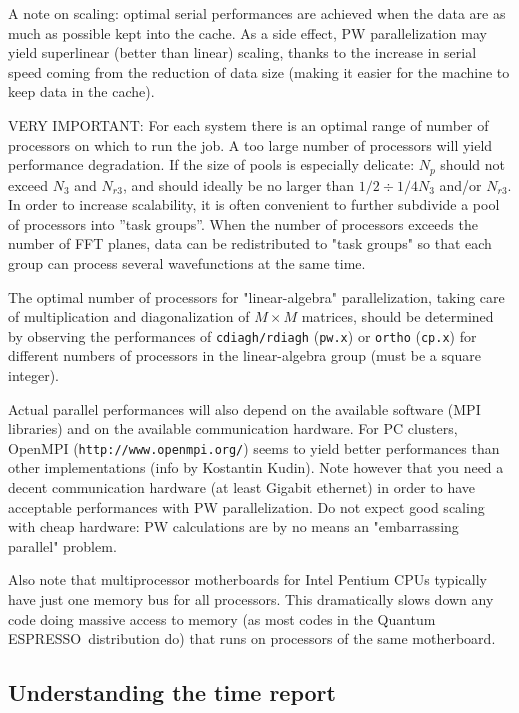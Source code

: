 \documentclass[12pt,a4paper]{article}
\def\qe{{\sc Quantum ESPRESSO}}
\def\pwx{\texttt{pw.x}}
\def\cpx{\texttt{cp.x}}
\begin{document}
A note on scaling: optimal serial performances are achieved when the data are
as much as possible kept into the cache. As a side effect, PW
parallelization may yield superlinear (better than linear) scaling,
thanks to the increase in serial speed coming from the reduction of data size 
(making it easier for the machine to keep data in the cache).

VERY IMPORTANT: For each system there is an optimal range of number of processors on which to 
run the job.  A too large number of processors will yield performance 
degradation. If the size of pools is especially delicate: $N_p$ should not 
exceed $N_3$ and $N_{r3}$, and should ideally be no larger than
$1/2\div1/4 N_3$ and/or $N_{r3}$. In order to increase scalability,
it is often convenient to 
further subdivide a pool of processors into ''task groups''.
When the number of processors exceeds the number of FFT planes, 
data can be redistributed to "task groups" so that each group 
can process several wavefunctions at the same time.

The optimal number of processors for "linear-algebra"
parallelization, taking care of multiplication and diagonalization 
of $M\times M$ matrices, should be determined by observing the
performances of \texttt{cdiagh/rdiagh} (\pwx) or \texttt{ortho} (\cpx)
for different numbers of processors in the linear-algebra group
(must be a square integer).

Actual parallel performances will also depend on the available software 
(MPI libraries) and on the available communication hardware. For
PC clusters, OpenMPI (\texttt{http://www.openmpi.org/}) seems to yield better 
performances than other implementations (info by Kostantin Kudin). 
Note however that you need a decent communication hardware (at least 
Gigabit ethernet) in order to have acceptable performances with 
PW parallelization. Do not expect good scaling with cheap hardware: 
PW calculations are by no means an "embarrassing parallel" problem.
   
Also note that multiprocessor motherboards for Intel Pentium CPUs typically 
have just one memory bus for all processors. This dramatically
slows down any code doing massive access to memory (as most codes 
in the \qe\ distribution do) that runs on processors of the same
motherboard.

\subsection{Understanding the time report}
\end{document}
